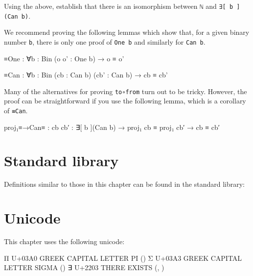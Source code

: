 Using the above, establish that there is an isomorphism between
\texttt{ℕ} and \texttt{∃{[}\ b\ {]}(Can\ b)}.

We recommend proving the following lemmas which show that, for a given
binary number \texttt{b}, there is only one proof of \texttt{One\ b} and
similarly for \texttt{Can\ b}.

\begin{myDisplay}
≡One : ∀{b : Bin} (o o' : One b) → o ≡ o'

≡Can : ∀{b : Bin} (cb : Can b) (cb' : Can b) → cb ≡ cb'
\end{myDisplay}

Many of the alternatives for proving \texttt{to∘from} turn out to be
tricky. However, the proof can be straightforward if you use the
following lemma, which is a corollary of \texttt{≡Can}.

\begin{myDisplay}
proj₁≡→Can≡ : {cb cb′ : ∃[ b ](Can b)} → proj₁ cb ≡ proj₁ cb′ → cb ≡ cb′
\end{myDisplay}

\begin{fence}
\begin{code}%
\>[0]\<%
\end{code}
\end{fence}

\hypertarget{standard-library}{%
\section{Standard library}\label{standard-library}}

Definitions similar to those in this chapter can be found in the
standard library:

\begin{fence}
\begin{code}%
\>[0]\AgdaSpace{}%
\AgdaSpace{}%
\AgdaSpace{}%
\AgdaSymbol{(}\AgdaSymbol{;}\AgdaSpace{}%
\AgdaOperator{\AgdaInductiveConstructor{\AgdaUnderscore{},\AgdaUnderscore{}}}\AgdaSymbol{;}\AgdaSpace{}%
\AgdaSymbol{;}\AgdaSpace{}%
\AgdaSymbol{;}\AgdaSpace{}%
\AgdaSymbol{)}\<%
\end{code}
\end{fence}

\hypertarget{unicode}{%
\section{Unicode}\label{unicode}}

This chapter uses the following unicode:

\begin{myDisplay}
Π  U+03A0  GREEK CAPITAL LETTER PI (\Pi)
Σ  U+03A3  GREEK CAPITAL LETTER SIGMA (\Sigma)
∃  U+2203  THERE EXISTS (\ex, \exists)
\end{myDisplay}

